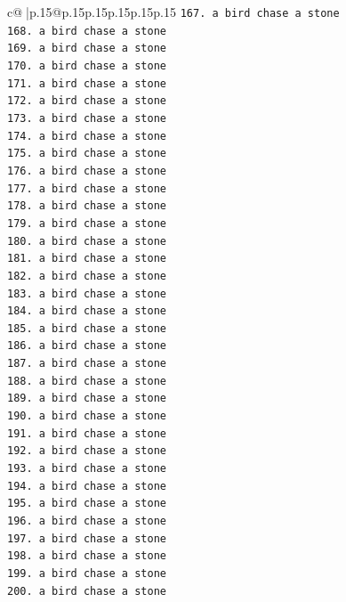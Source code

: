 \documentclass{article}
\begin{document}
{\begin{supertabular}{c@{$\;$}|p{.15\linewidth}@{}p{.15\linewidth}p{.15\linewidth}p{.15\linewidth}p{.15\linewidth}p{.15\linewidth}}
{{{\texttt{167. a bird chase a stone} \\
\texttt{168. a bird chase a stone} \\
\texttt{169. a bird chase a stone} \\
\texttt{170. a bird chase a stone} \\
\texttt{171. a bird chase a stone} \\
\texttt{172. a bird chase a stone} \\
\texttt{173. a bird chase a stone} \\
\texttt{174. a bird chase a stone} \\
\texttt{175. a bird chase a stone} \\
\texttt{176. a bird chase a stone} \\
\texttt{177. a bird chase a stone} \\
\texttt{178. a bird chase a stone} \\
\texttt{179. a bird chase a stone} \\
\texttt{180. a bird chase a stone} \\
\texttt{181. a bird chase a stone} \\
\texttt{182. a bird chase a stone} \\
\texttt{183. a bird chase a stone} \\
\texttt{184. a bird chase a stone} \\
\texttt{185. a bird chase a stone} \\
\texttt{186. a bird chase a stone} \\
\texttt{187. a bird chase a stone} \\
\texttt{188. a bird chase a stone} \\
\texttt{189. a bird chase a stone} \\
\texttt{190. a bird chase a stone} \\
\texttt{191. a bird chase a stone} \\
\texttt{192. a bird chase a stone} \\
\texttt{193. a bird chase a stone} \\
\texttt{194. a bird chase a stone} \\
\texttt{195. a bird chase a stone} \\
\texttt{196. a bird chase a stone} \\
\texttt{197. a bird chase a stone} \\
\texttt{198. a bird chase a stone} \\
\texttt{199. a bird chase a stone} \\
\texttt{200. a bird chase a stone} \\
}}}
\end{supertabular}}
\end{document}
